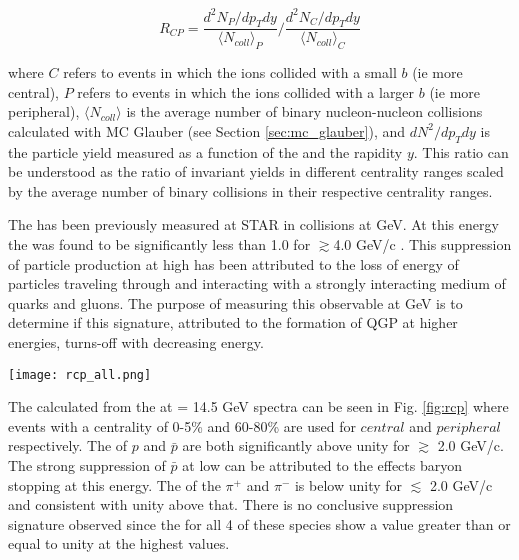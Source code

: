 	\begin{equation}
		R_{CP} = \frac{d^2 N_{P} / dp_{T}dy}{\langle N_{coll} \rangle_{P}} 
				\Big/ \frac{d^2 N_{C} / dp_{T}dy}{\langle N_{coll} \rangle_{C}}
		\label{eq:r_cp}
	\end{equation}

	\noindent
	where $C$ refers to events in which the ions collided with a small $b$ (ie more central), $P$ refers to events in which the ions collided with a larger $b$ (ie more peripheral), $\langle N_{coll} \rangle $ is the average number of binary nucleon-nucleon collisions calculated with MC Glauber (see Section \ref{sec:mc_glauber}), and $dN^2/dp_T dy$ is the particle yield measured as a function of the \pt and the rapidity $y$. This ratio can be understood as the ratio of invariant yields in different centrality ranges scaled by the average number of binary collisions in their respective centrality ranges.

	The \rcp has been previously measured at STAR in \auau collisions at  GeV. At this energy the \rcp was found to be significantly less than 1.0 for \pt $\gtrsim$4.0 GeV/c \cite{starcollaboration_transversemomentum_2003}. This suppression of particle production at high \pt has been attributed to the loss of energy of particles traveling through and interacting with a strongly interacting medium of quarks and gluons. The purpose of measuring this observable at  GeV is to determine if this signature, attributed to the formation of QGP at higher \snn energies, turns-off with decreasing \snn energy.

	\begin{sidewaysfigure}[ht]
		\centering 
		\texttt{[image: rcp\_all.png]} 

		\centering
		\caption{ \label{fig:rcp} The \rcp for \auau at  GeV for events with a centrality of (C=)0-5\% over those with (P=)60-80\%\cite{brandenburg_identified}. The large (red) error bar on the right hand side of each plot corresponds to the correlated uncertainty due to the MC Glauber calculation of $N_{coll}$ (See Section \ref{sec:mc_glauber}. } 
	\end{sidewaysfigure}

	The \rcp calculated from the \auau at \snn = 14.5 GeV spectra can be seen in Fig. \ref{fig:rcp} where events with a centrality of 0-5\% and 60-80\% are used for $central$ and $peripheral$ respectively. The \rcp of $p$ and $\bar{p}$ are both significantly above unity for \pt $\gtrsim$ 2.0 GeV/c. The strong suppression of $\bar{p}$ at low \pt can be attributed to the effects baryon stopping at this \snn energy. The \rcp of the $\pi^{+}$ and $\pi^{-}$ is below unity for \pt $\lesssim$ 2.0 GeV/c and consistent with unity above that. There is no conclusive suppression signature observed since the \rcp for all 4 of these species show a value greater than or equal to unity at the highest \pt values. 

